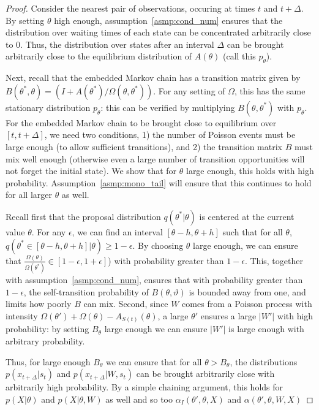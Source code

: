 \begin{proof}
Consider the nearest pair of observations, occuring at times $t$ and 
$t + \Delta$. %
By setting $\theta$ high enough, assumption~\ref{asmp:cond_num} ensures 
that the distribution over waiting times of each state can be concentrated 
arbitrarily close to $0$. Thus, the distribution over states after an 
interval $\Delta$ can be brought arbitrarily close to the equilibrium 
distribution of $A(\theta)$  (call this $p_{\theta}$).

Next, recall that the embedded Markov chain has a transition matrix 
given by $B(\theta^*,\theta) = (I + A(\theta^*)/\Omega(\theta,\theta^*))$. 
For any setting of $\Omega$, this has the same stationary distribution 
$p_{\theta}$: this can be verified by multiplying $B(\theta,\theta^*)$ with 
$p_\theta$. For the embedded Markov chain to be brought close to 
equilibrium over $[t,t+\Delta]$, we need two conditions, 1) the number of 
Poisson events must be large enough (to allow sufficient transitions), and 2) the 
transition matrix $B$ must mix well enough (otherwise even a 
large number of transition opportunities will not forget the initial state). 
We show that for $\theta$ large enough, this holds with high probability.
Assumption~\ref{asmp:mono_tail} will ensure that this continues to hold 
for all larger $\theta$ as well.

Recall first that the proposal distribution $q(\theta^*|\theta)$ is 
centered at the current value $\theta$. For any $\epsilon$, we can find 
an interval $[\theta-h,\theta+h]$ such that for all $\theta$, 
$q(\theta^* \in [\theta-h,\theta+h]|\theta)
\ge 1-\epsilon$. By choosing $\theta$ large 
enough, we can ensure that %
$\frac{\Omega(\theta)}{ \Omega(\theta^*)} \in [1-\epsilon,1+\epsilon]$) 
with probability greater than $1-\epsilon$.
This, together with assumption~\ref{asmp:cond_num}, ensures that with 
probability greater than $1-\epsilon$, the self-transition probability of $B(\theta,\vartheta)$ 
is bounded away from one, and limits how poorly $B$ can mix.
Second, since $W$ comes from a Poisson process with intensity 
$\Omega(\theta')+ \Omega(\theta) - A_{S(t)}(\theta)$, a large $\theta'$
ensures a large $|W'|$ with high probability: by setting $B_\theta$ large 
enough we can ensure $|W'|$ is large enough with arbitrary probability.

Thus, for large enough $B_\theta$ we can ensure that for all $\theta > 
B_\theta$, the distributions $p(x_{t+\Delta}|s_t)$ and 
$p(x_{t+\Delta}|W,s_t)$ can be brought arbitrarily close with arbitrarily 
high probability.  
By a simple chaining argument, this holds for $p(X|\theta)$ and 
$p(X|\theta,W)$ as well and so too 
$\alpha_I(\theta',\theta,X)$ and $\alpha(\theta',\theta,W,X)$
\end{proof}
